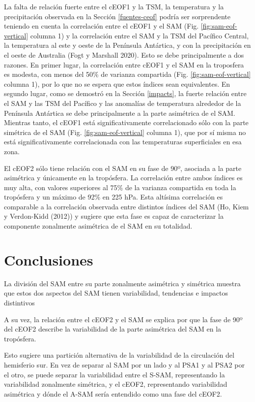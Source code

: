 \documentclass[12pt,oneside,a4paper]{reedthesis}
\begin{document}
La falta de relación fuerte entre el cEOF1 y la TSM, la temperatura y la precipitación observada en la Sección \ref{fuentes-ceof} podría ser sorprendente teniendo en cuenta la correlación entre el cEOF1 y el SAM (Fig. \ref{fig:sam-eof-vertical} columna 1) y la correlación entre el SAM y la TSM del Pacífico Central, la temperatura al este y oeste de la Península Antártica, y con la precipitación en el oeste de Australia (Fogt y Marshall 2020).
Esto se debe principalmente a dos razones.
En primer lugar, la correlación entre cEOF1 y el SAM en la troposfera es modesta, con menos del 50\% de varianza compartida (Fig. \ref{fig:sam-eof-vertical} columna 1), por lo que no se espera que estos índices sean equivalentes.
En segundo lugar, como se demostró en la Sección \ref{impacts}, la fuerte relación entre el SAM y las TSM del Pacífico y las anomalías de temperatura alrededor de la Península Antártica se debe principalmente a la parte asimétrica de el SAM.
Mientras tanto, el cEOF1 está significativamente correlacionado sólo con la parte simétrica de el SAM (Fig. \ref{fig:sam-eof-vertical} columna 1), que por sí misma no está significativamente correlacionada con las temperaturas superficiales en esa zona.

El cEOF2 sólo tiene relación con el SAM en su fase de 90º, asociada a la parte asimétrica y únicamente en la tropósfera.
La correlación entre ambos índices es muy alta, con valores superiores al 75\% de la varianza compartida en toda la tropósfera y un máximo de 92\% en 225 hPa.
Esta altísima correlación es comparable a la correlación observada entre distintos índices del SAM (Ho, Kiem y Verdon-Kidd (2012)) y sugiere que esta fase es capaz de caracterizar la componente zonalmente asimétrica de el SAM en su totalidad.

\hypertarget{conclusiones-1}{%
\section{Conclusiones}\label{conclusiones-1}}

La división del SAM entre su parte zonalmente asimétrica y simétrica muestra que estos dos aspectos del SAM tienen variabilidad, tendencias e impactos distintivos

A su vez, la relación entre el cEOF2 y el SAM se explica por que la fase de 90º del cEOF2 describe la variabilidad de la parte asimétrica del SAM en la tropósfera.

Esto sugiere una partición alternativa de la variabilidad de la circulación del hemisferio sur.
En vez de separar al SAM por un lado y al PSA1 y al PSA2 por el otro, se puede separar la variabilidad entre el S-SAM, representando la variabilidad zonalmente simétrica, y el cEOF2, representando variabilidad asimétrica y dónde el A-SAM sería entendido como una fase del cEOF2.
\end{document}
